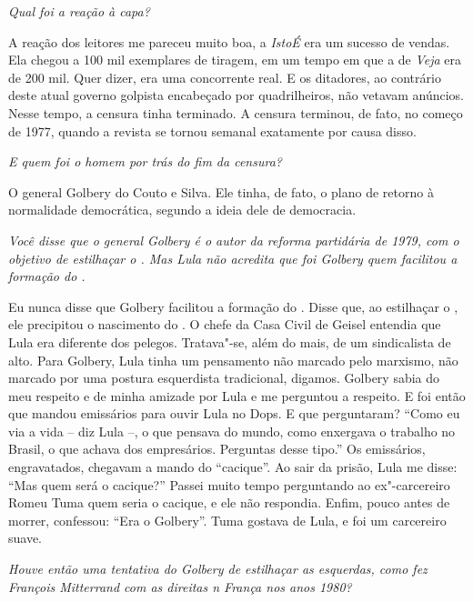 \itshape
 Qual foi a reação à capa?

\normalfont
A reação dos leitores me pareceu muito boa, a
\emph{IstoÉ} era um sucesso de vendas. Ela chegou a 100 mil exemplares
de tiragem, em um tempo em que a de \emph{Veja} era de 200 mil. Quer
dizer, era uma concorrente real. E os ditadores, ao contrário deste
atual governo golpista encabeçado por quadrilheiros, não vetavam
anúncios. Nesse tempo, a censura tinha terminado. A censura terminou, de
fato, no começo de 1977, quando a revista se tornou semanal exatamente
por causa disso.

\itshape
 E quem foi o homem por trás do fim da censura?

\normalfont
O general Golbery do Couto e Silva. Ele tinha, de fato, o
plano de retorno à normalidade democrática, segundo a ideia dele de
democracia.

\itshape
 Você disse que o general Golbery é o autor da reforma
partidária de 1979, com o objetivo de estilhaçar o . Mas Lula não
acredita que foi Golbery quem facilitou a formação do .

\normalfont
Eu nunca disse que Golbery facilitou a formação do .
Disse que, ao estilhaçar o , ele precipitou o nascimento do . O
chefe da Casa Civil de Geisel entendia que Lula era diferente dos
pelegos. Tratava"-se, além do mais, de um sindicalista de  alto. Para
Golbery, Lula tinha um pensamento não marcado pelo marxismo, não marcado
por uma postura esquerdista tradicional, digamos. Golbery sabia do meu
respeito e de minha amizade por Lula e me perguntou a respeito. E foi
então que mandou emissários para ouvir Lula no Dops. E que perguntaram?
``Como eu via a vida -- diz Lula --, o que pensava do mundo, como
enxergava o trabalho no Brasil, o que achava dos empresários. Perguntas
desse tipo.'' Os emissários, engravatados, chegavam a mando do
``cacique''. Ao sair da prisão, Lula me disse: ``Mas quem será o
cacique?'' Passei muito tempo perguntando ao ex"-carcereiro Romeu Tuma
quem seria o cacique, e ele não respondia. Enfim, pouco antes de morrer,
confessou: ``Era o Golbery''. Tuma gostava de Lula, e foi um carcereiro
suave.

\itshape
 Houve então uma tentativa do Golbery de estilhaçar as
esquerdas, como fez François Mitterrand com as direitas n França nos
anos 1980?


